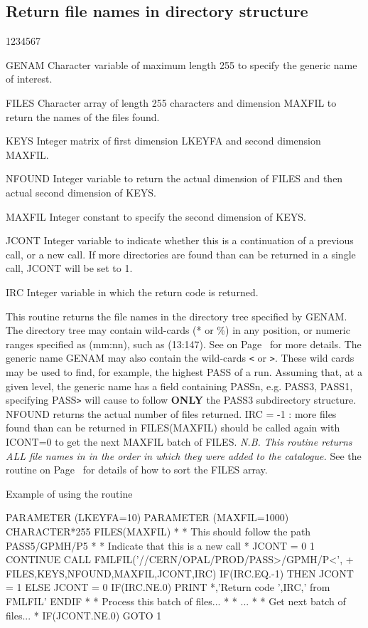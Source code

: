 \subsection{Return file names in directory structure}
\begin{DLtt}{1234567}
\item[GENAM]
Character variable of maximum length 255 to specify the generic name of
interest.
\item[FILES ]
Character array of length 255 characters and dimension MAXFIL
to return the names of the files found.
\item[KEYS  ]
Integer matrix of first dimension LKEYFA and second dimension MAXFIL.
\item[NFOUND]
Integer variable to return the actual dimension of FILES and
then actual second dimension of KEYS.
\item[MAXFIL]
Integer constant to specify the second dimension of KEYS.
\item[JCONT]
Integer variable to indicate whether this is a continuation
of a previous call, or a new call.
If more directories are found than can be returned in a single
call, JCONT will be set to 1.
\item[IRC]
Integer variable in which the return code is returned.
\end{DLtt}

This routine returns the file names
in the directory tree specified by GENAM. 
The directory tree may contain wild-cards (* or \%) in any position,
or numeric ranges specified as (mm:nn), such as (13:147).
See on Page~\pageref{FMATCH} for more details.
The generic name
GENAM may also contain the wild-cards {\tt<} or {\tt>}. These wild cards
may be used to find, for example, the highest PASS of a run.
Assuming that, at a given level, the generic name has a field
containing PASSn, e.g. PASS3, PASS1, specifying PASS{\tt>} will
cause  to follow {\bf ONLY} the PASS3 subdirectory
structure.
NFOUND returns the actual number of files returned.
IRC = -1 : more files found than can be returned in FILES(MAXFIL)
 should be called again with ICONT=0 to get the next MAXFIL
batch of FILES.
{\it N.B. This routine returns ALL file names in
in the order in which they were added to the catalogue.}
See the routine on Page~\pageref{FMSORT} for details of how to
sort the FILES array.

\begin{XMPt}{Example of using the \protect{} routine}

      PARAMETER     (LKEYFA=10)
      PARAMETER     (MAXFIL=1000)
      CHARACTER*255 FILES(MAXFIL)
*
*     This should follow the path PASS5/GPMH/P5
*
*     Indicate that this is a new call
*
      JCONT = 0
 1    CONTINUE
      CALL FMLFIL('//CERN/OPAL/PROD/PASS>/GPMH/P<',
     +            FILES,KEYS,NFOUND,MAXFIL,JCONT,IRC)
      IF(IRC.EQ.-1) THEN
         JCONT = 1
      ELSE
         JCONT = 0
         IF(IRC.NE.0) PRINT *,'Return code ',IRC,' from FMLFIL'
      ENDIF
*
*     Process this batch of files...
*
*     ...
*
*     Get next batch of files...
*
      IF(JCONT.NE.0) GOTO 1
\end{XMPt}

